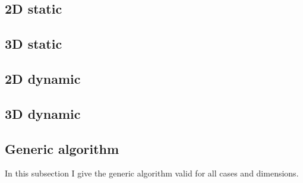 \documentclass[12pt, a4paper]{article}
\begin{document}
\subsection{2D static}

\begin{scriptsize}
\begin{ttfamily}

\end{ttfamily}
\end{scriptsize}

\subsection{3D static}

\begin{scriptsize}
\begin{ttfamily}

\end{ttfamily}
\end{scriptsize}

\subsection{2D dynamic}

\begin{scriptsize}
\begin{ttfamily}

\end{ttfamily}
\end{scriptsize}

\subsection{3D dynamic}

\begin{scriptsize}
\begin{ttfamily}

\end{ttfamily}
\end{scriptsize}


\subsection{Generic algorithm}

In this subsection I give the generic algorithm valid for all cases and dimensions.\\
\end{document}
